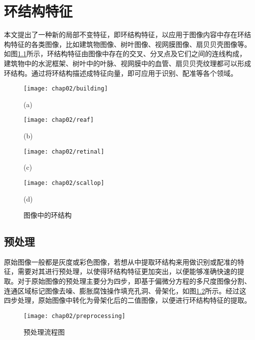

\chapter{环结构特征}
\label{cha:cycle}



本文提出了一种新的局部不变特征，即环结构特征，以应用于图像内容中存在环结构特征的各类图像，比如建筑物图像、树叶图像、视网膜图像、扇贝贝壳图像等。如图\ref{fig:Example}所示，环结构特征由图像中存在的交叉、分叉点及它们之间的连线构成，建筑物中的水泥框架、树叶中的叶脉、视网膜中的血管、扇贝贝壳纹理都可以形成环结构。通过将环结构描述成特征向量，即可应用于识别、配准等各个领域。

\begin{figure}[H]
\centering
  \begin{minipage}[b]{0.48\textwidth} 
      \centering 
      \texttt{[image: chap02/building]}
        \centerline{(a)}\medskip
    \end{minipage}
  \begin{minipage}[b]{0.48\textwidth}
    \centering
    \texttt{[image: chap02/reaf]}
      \centerline{(b)}\medskip
  \end{minipage}
  \begin{minipage}[b]{0.48\textwidth}
    \centering
    \texttt{[image: chap02/retinal]}
      \centerline{(c)}\medskip
  \end{minipage}
  \begin{minipage}[b]{0.48\textwidth}
    \centering
    \texttt{[image: chap02/scallop]}
      \centerline{(d)}\medskip
  \end{minipage}
\caption{图像中的环结构}
\label{fig:Example}
\end{figure}




\section{预处理}
\label{}

原始图像一般都是灰度或彩色图像，若想从中提取环结构来用做识别或配准的特征，需要对其进行预处理，以使得环结构特征更加突出，以便能够准确快速的提取。对于原始图像的预处理主要分为四步，即基于偏微分方程的多尺度图像分割、连通区域标记图像去噪、膨胀腐蚀操作填充孔洞、骨架化，如图\ref{fig:Preprocessing}所示。经过这四步处理，原始图像中转化为骨架化后的二值图像，以便进行环结构特征的提取。
\begin{figure}[H]
\centering
    \centering
    \texttt{[image: chap02/preprocessing]}\medskip
\caption{预处理流程图}
\label{fig:Preprocessing}
\end{figure}
